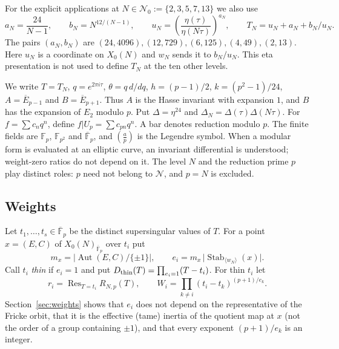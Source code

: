 \documentclass[11pt,a4paper]{article}
\numberwithin{equation}{section}
\theoremstyle{definition}
\theoremstyle{remark}
\newcommand{\Fp}{\mathbb F_p}
\newcommand{\Fq}{\mathbb F_{p^2}}
\newcommand{\Fb}{\overline{\mathbb F}_p}
\newcommand{\Res}{\operatorname{Res}}
\newcommand{\Aut}{\operatorname{Aut}}
\newcommand{\Stab}{\operatorname{Stab}}
\begin{document}
For the explicit applications at
$N\in\mathcal N_0:=\{2,3,5,7,13\}$ we also use
\[
a_N=\frac{24}{N-1},\qquad b_N=N^{12/(N-1)},\qquad
u_N=\left(\frac{\eta(\tau)}{\eta(N\tau)}\right)^{a_N},\qquad
T_N=u_N+a_N+b_N/u_N.
\]
The pairs $(a_N,b_N)$ are $(24,4096),(12,729),(6,125),(4,49),(2,13)$.
Here $u_N$ is a coordinate on $X_0(N)$ and $w_N$ sends it to $b_N/u_N$.
This eta presentation is not used to define $T_N$ at the ten other levels.

We write $T=T_N$, $q=e^{2\pi i\tau}$, $\theta=q\,d/dq$,
$h=(p-1)/2$, $k=(p^2-1)/24$, $A=\overline E_{p-1}$ and
$B=\overline E_{p+1}$. Thus $A$ is the Hasse invariant with expansion
$1$, and $B$ has the expansion of $E_2$ modulo $p$. Put
$\Delta=\eta^{24}$ and $\Delta_N=\Delta(\tau)\Delta(N\tau)$.
For $f=\sum c_nq^n$, define $f|U_p=\sum c_{pn}q^n$.
A bar denotes reduction modulo $p$. The finite fields are
$\Fp$, $\Fq$ and $\Fb$, and $\left(\frac{a}{p}\right)$ is the Legendre symbol.
When a modular form is evaluated at an elliptic curve, an invariant
differential is understood; weight-zero ratios do not depend on it.
The level $N$ and the reduction prime $p$ play distinct roles:
$p$ need not belong to $\mathcal N$, and $p=N$ is excluded.

\subsection{Weights}
Let $t_1,\dots,t_s\in\Fb$ be the distinct supersingular values of $T$. For a point
$x=(E,C)$ of $X_0(N)_{\Fb}$ over $t_i$ put
\[
m_x=\bigl|\Aut(E,C)/\{\pm1\}\bigr|,\qquad e_i=m_x\,\bigl|\Stab_{\langle w_N\rangle}(x)\bigr|.
\]
Call $t_i$ \emph{thin} if $e_i=1$ and put $D_{\rm thin}(T)=\prod_{e_i=1}(T-t_i)$. For thin $t_i$ let
\[
r_i=\Res_{T=t_i}R_{N,p}(T),\qquad W_i=\prod_{k\ne i}(t_i-t_k)^{(p+1)/e_k}.
\]
Section~\ref{sec:weights} shows that $e_i$ does not depend on the representative of the Fricke
orbit, that it is the effective (tame) inertia of the quotient map at $x$ (not the order of a group
containing $\pm1$), and that every exponent $(p+1)/e_k$ is an integer.
\end{document}
